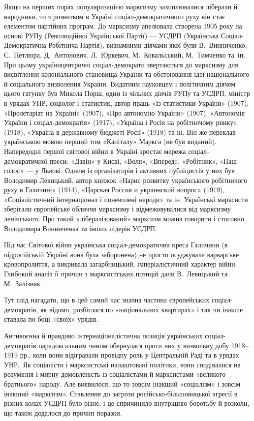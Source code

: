 Якщо на перших порах популяризацією марксизму захоплювалися ліберали 
й народники, то з розвитком в Україні соціал-демократичного руху він 
стає елементом партійних програм. До марксизму апелювала створена 1905 
року на основі РУПу (Революційної Української Партії) — УСДРП 
(Українська Соціал-Демократична Робітнича Партія), визначними діячами 
якої були В.~Винниченко, С.~Петлюра, Д.~Антонович, Л.~Юркевич,
М.~Ковальський, М.~Тимченко та~ін. При цьому україноцентричні 
соціал-демократи звертаються до марксизму для висвітлення 
колоніального становища України та обстоювання ідеї національного й 
соціального визволення України. Видатним науковцем і політичним 
діячем цього гатунку був Микола Порш, один із чільних діячів РУПу та 
УСДРП, міністр в урядах УНР, соціолог і статистик, автор праць «Із 
статистики України» (1907), «Пролетаріат на Україні» (1907), «Про автономію 
України» (1907), «Автономія України і соціал-демократія» (1917), «Україна і 
Росія на робітничому ринку» (1918), «Україна в державному бюджеті Росії» 
(1918) та ін. Він же переклав українською мовою перший том «Капіталу» 
Маркса (не був виданий). Напередодні першої світової війни в Україні 
зростає мережа соціал-демократичної преси: «Дзвін» у Києві, «Воля», 
«Вперед», «Робітник», «Наш голос» — у Львові. Одним із організаторів і 
активних публіцистів у них був Володимир Левицький, автор книжок 
«Нарис розвитку українського робітничого руху в Галичині» (1914), 
«Царская Россия и украинский вопрос» (1919), «Соціалістичний 
інтернаціонал і поневолені народи» та ін. Українські марксисти 
зберігали європейське обличчя марксизму і відмежовувалися від 
марксизму ленінського. Про такий «лібералізований» марксизм можна 
говорити і стосовно Володимира Винниченка та інших лідерів УСДРП. 


Під час Світової війни українська соціал-демократична преса Галичини 
(в підросійській Україні вона була заборонена) не просто осуджувала 
варварське кровопролиття, а викривала загарбницький, 
імперіалістичний характер війни. Глибокий аналіз її причин з 
марксистських позицій дали В.~Левицький та М.~Залізняк. 


Тут слід нагадати, що в цей самий час значна частина європейських 
соціал-демократів, як відомо, розбіглася по «національних квартирах» 
і так чи інакше ставала по боці «своїх» урядів. 


Антивоєнна й правдиво інтернаціоналістична позиція українських 
соціал-демократів парадоксальним чином обернулася проти них у 
визвольну добу 1918--1919 рр., коли вони відігравали провідну роль у 
Центральній Раді та в урядах УНР.~Як соціалісти і марксистські 
налаштовані політики, вони сподівалися на розуміння і мирну 
домовленість із соціалістами й марксистами «великого братнього» 
народу. Але виявилося, що то зовсім інакший «соціалізм» і зовсім 
інакший «марксизм». Ставлення до загрози російсько-більшовицької 
агресії в різних колах УСДРП було різне, і це спричинило внутрішню 
боротьбу й розколи, що також додалося до причин поразки. 


